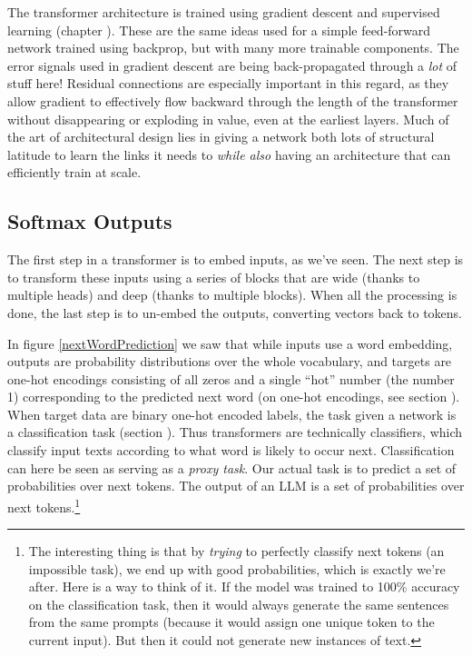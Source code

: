The transformer architecture is trained using gradient descent and supervised
learning (chapter ). These are the same ideas used for a
simple feed-forward network trained using backprop, but with many more
trainable components. The error signals used in gradient descent are being
back-propagated through a \emph{lot} of stuff here! Residual connections are
especially important in this regard, as they allow gradient to effectively flow
backward through the length of the transformer without disappearing or
exploding in value, even at the earliest layers. Much of the art of
architectural design lies in giving a network both lots of structural latitude
to learn the links it needs to \emph{while also} having an architecture that can
efficiently train at scale.

\subsection{Softmax Outputs}\label{llmOutput}

The first step in a transformer is to embed inputs, as we've seen. The next
step is to transform these inputs using a series of blocks that are wide
(thanks to multiple heads) and deep (thanks to multiple blocks). When all the
processing is done, the last step is to un-embed the outputs, converting
vectors back to tokens. 

In figure \ref{nextWordPrediction} we saw that while inputs use a word
embedding, outputs are probability distributions over the whole vocabulary, and
targets are one-hot encodings consisting of all zeros and a single ``hot''
number (the number 1) corresponding to the predicted next word (on one-hot
encodings, see section ). When target data are binary one-hot
encoded labels, the task given a network is a classification task (section
). Thus transformers are technically
classifiers, which classify input texts according to what word is likely to
occur next. Classification can here be seen as serving as a \emph{proxy task}.
Our actual task is to predict a set of probabilities over next tokens. The
output of an LLM is a set of probabilities over next tokens.\footnote{The
interesting thing is that by \emph{trying} to perfectly classify next tokens
(an impossible task), we end up with good probabilities, which is exactly we're
after. Here is a way to think of it. If the model was trained to 100\% accuracy
on the classification task, then it would always generate the same sentences
from the same prompts (because it would assign one unique token to the current
input). But then it could not generate new instances of text.}

